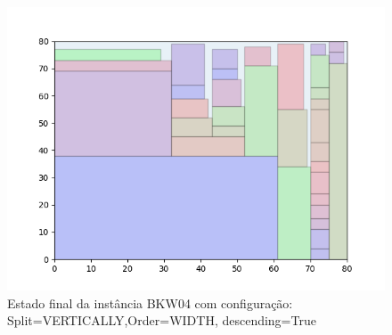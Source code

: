 \begin{figure}[H]
    \centering
    \caption[]{Estado final da instância BKW04 com configuração: Split=VERTICALLY,Order=WIDTH, descending=True}
    \label{fig:bkw04-vertically-width-true}
    \includegraphics[scale=0.5]{output/figures/bkw/bkw04/vertically/width/true/00}
\end{figure}